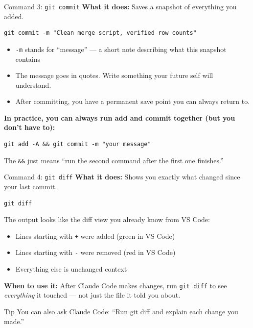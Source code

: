 \documentclass[aspectratio=169, 11pt]{beamer}
\begin{document}
\begin{frame}[fragile]{Command 3: \texttt{git commit}}
  \textbf{What it does:} Saves a snapshot of everything you added.

  \vspace{0.5em}
  \begin{lstlisting}
git commit -m "Clean merge script, verified row counts"
  \end{lstlisting}

  \vspace{0.5em}
  \begin{itemize}
    \item \texttt{-m} stands for ``message'' --- a short note describing what this snapshot contains
    \item The message goes in quotes. Write something your future self will understand.
    \item After committing, you have a permanent save point you can always return to.
  \end{itemize}

  \vspace{0.5em}
  \textbf{In practice, you can always run add and commit together (but you don't have to):}
  \begin{lstlisting}
git add -A && git commit -m "your message"
  \end{lstlisting}

  \vspace{0.3em}
  The \texttt{\&\&} just means ``run the second command after the first one finishes.''
\end{frame}

\begin{frame}[fragile]{Command 4: \texttt{git diff}}
  \textbf{What it does:} Shows you exactly what changed since your last commit.

  \vspace{0.5em}
  \begin{lstlisting}
git diff
  \end{lstlisting}

  \vspace{0.5em}
  The output looks like the diff view you already know from VS Code:
  \begin{itemize}
    \item Lines starting with \texttt{+} were added (green in VS Code)
    \item Lines starting with \texttt{-} were removed (red in VS Code)
    \item Everything else is unchanged context
  \end{itemize}

  \vspace{0.5em}
  \textbf{When to use it:} After Claude Code makes changes, run \texttt{git diff} to see \textit{everything} it touched --- not just the file it told you about.

  \vspace{0.5em}
  \begin{block}{Tip}
    You can also ask Claude Code: ``Run git diff and explain each change you made.''
  \end{block}
\end{frame}
\end{document}
